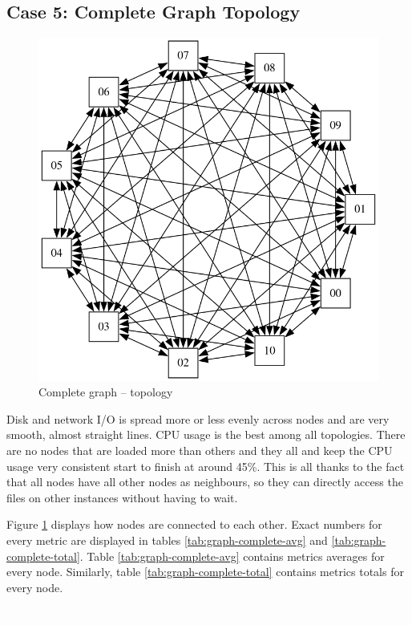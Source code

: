 



\newpage
\subsection{Case 5: Complete Graph Topology}

\begin{figure}
\centering
\captionsetup{justification=centering,width=0.8\linewidth}
\includegraphics[width=0.7\linewidth]{figures/topologies/graph-complete.png}
\caption{Complete graph -- topology}
\label{fig:graph-complete-topology}
\end{figure}

Disk and network I/O is spread more or less evenly across nodes and are very
smooth, almost straight lines. CPU usage is the best among all topologies.
There are no nodes that are loaded more than others and they all and keep the
CPU usage very consistent start to finish at around 45\%. This is all thanks to
the fact that all nodes have all other nodes as neighbours, so they can
directly access the files on other instances without having to wait.

Figure \ref{fig:graph-complete-topology} displays how nodes are connected to
each other. Exact numbers for every metric are displayed in tables
\ref{tab:graph-complete-avg} and \ref{tab:graph-complete-total}. Table
\ref{tab:graph-complete-avg} contains metrics averages for every node.
Similarly, table \ref{tab:graph-complete-total} contains metrics totals for
every node.

\textcolor{white}{.}\\\\\\

